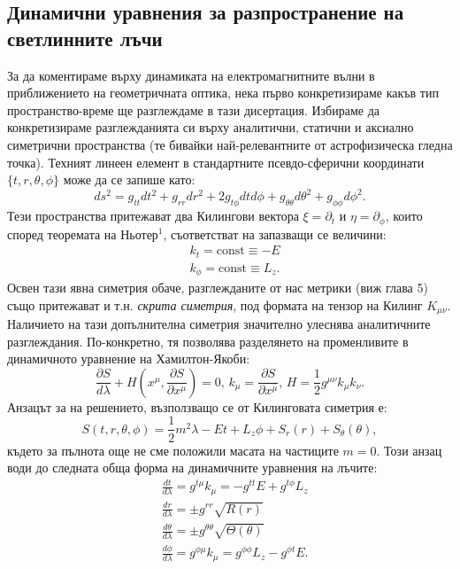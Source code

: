 \subsection{Динамични уравнения за разпространение на светлинните лъчи}
За да коментираме върху динамиката на електромагнитните вълни в приближението на геометричната оптика, нека първо конкретизираме какъв тип пространство-време ще разглеждаме в тази дисертация. Избираме да конкретизираме разглежданията си върху аналитични, статични и аксиално симетрични пространства (те бивайки най-релевантните от астрофизическа гледна точка). Техният линеен елемент в стандартните псевдо-сферични координати $\{t,r,\theta,\phi\}$ може да се запише като:
\begin{equation}
	ds^2 = g_{tt}dt^2 + g_{rr}dr^2 + 2g_{t\phi}dtd\phi + g_{\theta\theta}d\theta^2 + g_{\phi\phi} d\phi^2. 
\end{equation}
Тези пространства притежават два Килингови вектора $\xi = \partial_t$ и $\eta = \partial_\phi$, които според теоремата на Ньотер$^1$, съответстват на запазващи се величини:
\begin{subequations}
	\begin{align}
		&k_t = \text{const} \equiv -E\\
		&k_\phi = \text{const} \equiv L_z.
	\end{align}
\end{subequations}
Освен тази явна симетрия обаче, разглежданите от нас метрики (виж глава 5) също притежават и т.н. \emph{скрита симетрия}, под формата на тензор на Килинг $K_{\mu\nu}$. Наличието на тази допълнителна симетрия значително улеснява аналитичните разглеждания. По-конкретно, тя позволява разделянето на променливите в динамичното уравнение на Хамилтон-Якоби:
\begin{equation}
	\frac{\partial S}{d\lambda} + H\left(x^\mu,\frac{\partial S}{\partial x^\mu}\right) = 0, \,k_\mu = \frac{\partial S}{\partial x^\mu},\, H = \frac{1}{2}g^{\mu\nu}k_\mu k_\nu.
\end{equation}
Анзацът за на решението, възползващо се от Килинговата симетрия е:
\begin{equation}
	S(t,r,\theta,\phi) = \frac{1}{2}m^2\lambda -Et + L_z\phi + S_r(r) + S_\theta(\theta),
\end{equation}
където за пълнота още не сме положили масата на частиците $m = 0$. Този анзац води до следната обща форма на динамичните уравнения на лъчите:
\begin{subequations}
	\begin{align}
		&\frac{dt}{d\lambda} = g^{t\mu}k_\mu = -g^{tt}E + g^{t\phi}L_z\\
		&\frac{dr}{d\lambda} = \pm g^{rr}\sqrt{R(r)}\\
		&\frac{d\theta}{d\lambda} = \pm g^{\theta\theta}\sqrt{\Theta(\theta)}\\
		&\frac{d\phi}{d\lambda} = g^{\phi\mu}k_\mu = g^{\phi\phi}L_z - g^{\phi t}E.
	\end{align}
\end{subequations}
